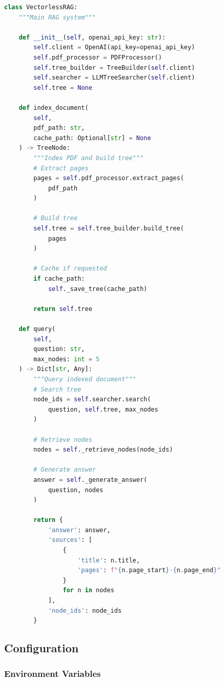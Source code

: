 \begin{lstlisting}[language=Python, caption=Main RAG Class]
class VectorlessRAG:
    """Main RAG system"""
    
    def __init__(self, openai_api_key: str):
        self.client = OpenAI(api_key=openai_api_key)
        self.pdf_processor = PDFProcessor()
        self.tree_builder = TreeBuilder(self.client)
        self.searcher = LLMTreeSearcher(self.client)
        self.tree = None
    
    def index_document(
        self,
        pdf_path: str,
        cache_path: Optional[str] = None
    ) -> TreeNode:
        """Index PDF and build tree"""
        # Extract pages
        pages = self.pdf_processor.extract_pages(
            pdf_path
        )
        
        # Build tree
        self.tree = self.tree_builder.build_tree(
            pages
        )
        
        # Cache if requested
        if cache_path:
            self._save_tree(cache_path)
        
        return self.tree
    
    def query(
        self,
        question: str,
        max_nodes: int = 5
    ) -> Dict[str, Any]:
        """Query indexed document"""
        # Search tree
        node_ids = self.searcher.search(
            question, self.tree, max_nodes
        )
        
        # Retrieve nodes
        nodes = self._retrieve_nodes(node_ids)
        
        # Generate answer
        answer = self._generate_answer(
            question, nodes
        )
        
        return {
            'answer': answer,
            'sources': [
                {
                    'title': n.title,
                    'pages': f"{n.page_start}-{n.page_end}"
                }
                for n in nodes
            ],
            'node_ids': node_ids
        }
\end{lstlisting}

\subsection{Configuration}

\subsubsection{Environment Variables}

